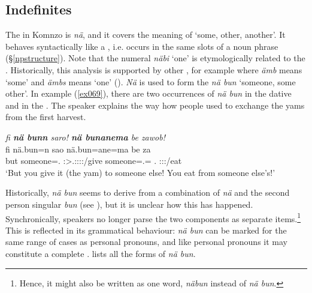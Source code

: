 \subsection{Indefinites}\label{indefinite-sec}

The   in Komnzo is \emph{nä}, and it covers the meaning of `some, other, another'. It behaves syntactically like a , i.e. occurs in the same slots of a noun phrase (\S\ref{npstructure}). Note that the numeral \emph{näbi} `one' is etymologically related to the . Historically, this analysis is supported by other , for example  where \emph{ämb} means `some' and \emph{ämbs} means `one' (\citealt{Evans:quant}). \emph{Nä} is used to form the   \emph{nä bun} `someone, some other'. In example (\ref{ex069}), there are two occurrences of \emph{nä bun} in the dative  and in the  . The speaker explains the way how people used to exchange the yams from the first harvest.

\begin{exe}
	\ex \emph{fi \textbf{nä bunn} saro! \textbf{nä bunanema} be zawob!}\\
	\gll fi {nä.bun=n} sao {nä.bun=ane=ma} be za\\
	but {someone=\Dat.\Sg} \Sg:\Sbj>\Tsg.\Masc:\Io:\Imp:\Pfv:\Andat/give {someone=\Poss.\Sg={\Char}} \Ssg{}.{\Erg} \Stsg:\Sbj:\Imp:\Pfv/eat\\
	\trans `But you give it (the yam) to someone else! You eat from someone else's!'\\ 
	\label{ex069}
\end{exe}%

Historically, \emph{nä bun} seems to derive from a combination of \emph{nä} and the second person singular   \emph{bun} (see ), but it is unclear how this has happened. Synchronically, speakers no longer parse the two components as separate items.\footnote{Hence, it might also be written as one word, \emph{näbun} instead of \emph{nä bun}.} This is reflected in its grammatical behaviour: \emph{nä bun} can be marked for the same range of cases as personal pronouns, and like personal pronouns it may constitute a complete .  lists all the  forms of \emph{nä bun}.

